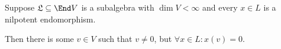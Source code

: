 Suppose $\mathfrak{L} \subseteq \End V$ is a subalgebra
with $\dim V<\infty$ and every $x \in L$ is a nilpotent endomorphism.

Then there is some $v \in V$ such that $v\neq 0$, but $\forall x \in L\colon x(v) = 0$.
